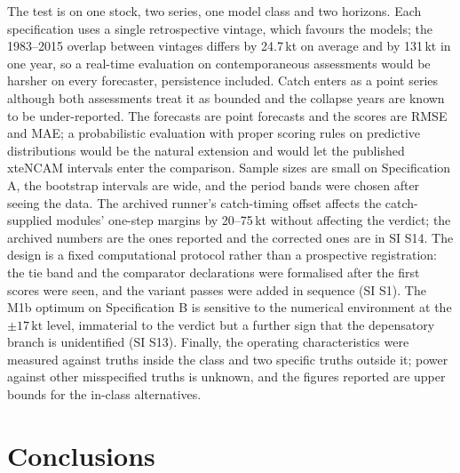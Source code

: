 \documentclass[preprint,11pt,authoryear]{elsarticle}
\theoremstyle{definition}
\theoremstyle{remark}
\newcommand{\kt}{\,\mathrm{kt}}
\begin{document}
The test is on one stock, two series, one model class and two horizons. Each specification uses a single retrospective vintage, which favours the models; the 1983--2015 overlap between vintages differs by 24.7\,kt on average and by 131\,kt in one year, so a real-time evaluation on contemporaneous assessments would be harsher on every forecaster, persistence included. Catch enters as a point series although both assessments treat it as bounded and the collapse years are known to be under-reported. The forecasts are point forecasts and the scores are RMSE and MAE; a probabilistic evaluation with proper scoring rules on predictive distributions \citep{HyndmanAthanasopoulos2021} would be the natural extension and would let the published xteNCAM intervals enter the comparison. Sample sizes are small on Specification A, the bootstrap intervals are wide, and the period bands were chosen after seeing the data. The archived runner's catch-timing offset affects the catch-supplied modules' one-step margins by 20--75\,kt without affecting the verdict; the archived numbers are the ones reported and the corrected ones are in SI S14. The design is a fixed computational protocol rather than a prospective registration: the tie band and the comparator declarations were formalised after the first scores were seen, and the variant passes were added in sequence (SI S1). The M1b optimum on Specification B is sensitive to the numerical environment at the $\pm17\kt$ level, immaterial to the verdict but a further sign that the depensatory branch is unidentified (SI S13). Finally, the operating characteristics were measured against truths inside the class and two specific truths outside it; power against other misspecified truths is unknown, and the figures reported are upper bounds for the in-class alternatives.
\section{Conclusions}\label{sec:conclusions}
\end{document}
